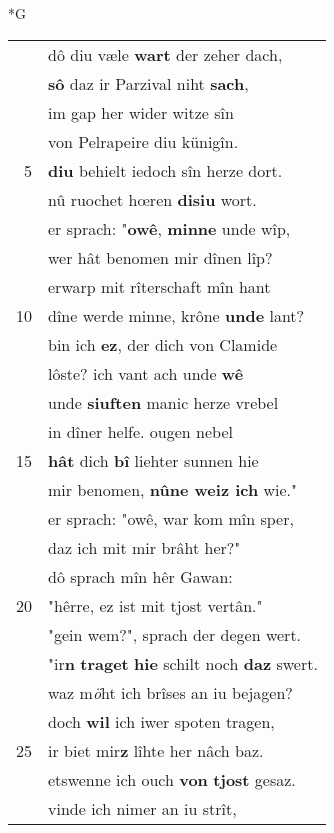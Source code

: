 \documentclass[8pt,a4paper,notitlepage]{article}
\begin{document}
\newpage
\begin{table}[ht]
\begin{minipage}[t]{0.5\linewidth}
\small
\begin{center}*G
\end{center}
\begin{tabular}{rl}
 & dô diu væle \textbf{wart} der zeher dach,\\ 
 & \textbf{sô} daz ir Parzival niht \textbf{sach},\\ 
 & im gap her wider witze sîn\\ 
 & von Pelrapeire diu künigîn.\\ 
5 & \textbf{diu} behielt iedoch sîn herze dort.\\ 
 & nû ruochet hœren \textbf{disiu} wort.\\ 
 & er sprach: "\textbf{owê}, \textbf{minne} unde wîp,\\ 
 & wer hât benomen mir dînen lîp?\\ 
 & erwarp mit rîterschaft mîn hant\\ 
10 & dîne werde minne, krône \textbf{unde} lant?\\ 
 & bin ich \textbf{ez}, der dich von Clamide\\ 
 & lôste? ich vant ach unde \textbf{wê}\\ 
 & unde \textbf{siuften} manic herze vrebel\\ 
 & in dîner helfe. ougen nebel\\ 
15 & \textbf{hât} dich \textbf{bî} liehter sunnen hie\\ 
 & mir benomen, \textbf{nûne weiz ich} wie."\\ 
 & er sprach: "owê, war kom mîn sper,\\ 
 & daz ich mit mir brâht her?"\\ 
 & dô sprach mîn hêr Gawan:\\ 
20 & "hêrre, ez ist mit tjost vertân."\\ 
 & "gein wem?", sprach der degen wert.\\ 
 & "ir\textbf{n} \textbf{traget} \textbf{hie} schilt noch \textbf{daz} swert.\\ 
 & waz m\textit{ö}ht ich brîses an iu bejagen?\\ 
 & doch \textbf{wil} ich iwer spoten tragen,\\ 
25 & ir biet mir\textbf{z} lîhte her nâch baz.\\ 
 & etswenne ich ouch \textbf{von} \textbf{tjost} gesaz.\\ 
 & vinde ich nimer an iu strît,\\ 

\end{tabular}
\end{minipage}
\end{table}
\end{document}
